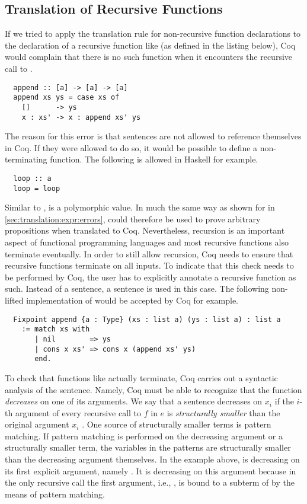 \subsection{Translation of Recursive Functions} \label{sec:translation:func-decl:rec}
If we tried to apply the translation rule for non-recursive function declarations to the declaration of a recursive function like  (as defined in the listing below), Coq would complain that there is no such function when it encounters the recursive call to .
\begin{verbatim}
  append :: [a] -> [a] -> [a]
  append xs ys = case xs of
    []      -> ys
    x : xs' -> x : append xs' ys
\end{verbatim}
The reason for this error is that  sentences are not allowed to reference themselves in Coq.
If they were allowed to do so, it would be possible to define a non-terminating function.
The following is allowed in Haskell for example.
\begin{verbatim}
  loop :: a
  loop = loop
\end{verbatim}
Similar to ,  is a polymorphic value.
In much the same way as shown for  in \autoref{sec:translation:expr:errors},  could therefore be used to prove arbitrary propositions when translated to Coq.
Nevertheless, recursion is an important aspect of functional programming languages and most recursive functions also terminate eventually.
In order to still allow recursion, Coq needs to ensure that recursive functions terminate on all inputs.
To indicate that this check needs to be performed by Coq, the user has to explicitly annotate a recursive function as such.
Instead of a  sentence, a  sentence is used in this case.
The following non-lifted implementation of  would be accepted by Coq for example.
\begin{verbatim}
  Fixpoint append {a : Type} (xs : list a) (ys : list a) : list a
    := match xs with
       | nil        => ys
       | cons x xs' => cons x (append xs' ys)
       end.
\end{verbatim}
To check that functions like  actually terminate, Coq carries out a syntactic analysis of the  sentence.
Namely, Coq must be able to recognize that the function \textit{decreases} on one of its arguments.
We say that a  sentence  decreases on $x_i$ if the $i$-th argument of every recursive call to $f$ in $e$ is \textit{structurally smaller} than the original argument $x_i$ \cite[p.~111]{CoqDevTeam:2018}.
One source of structurally smaller terms is pattern matching.
If pattern matching is performed on the decreasing argument or a structurally smaller term, the variables in the patterns are structurally smaller than the decreasing argument themselves.
In the example above,  is decreasing on its first explicit argument, namely .
It is decreasing on this argument because in the only recursive call  the first argument, i.e., , is bound to a subterm of  by the means of pattern matching.

